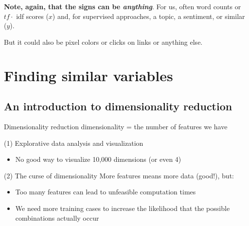 \documentclass[compress]{beamer}
\begin{document}
\begin{frame}[plain]
\textbf{Note, again, that the  signs can be \emph{anything}}.
For us, often word counts or $tf\cdot$ idf scores ($x$) and, for supervised approaches, a topic, a sentiment, or similar ($y$). 

But it could also be pixel colors or clicks on links or anything else.
\begin{table}[]
\end{table}
\end{frame}


\section{Finding similar variables}

\subsection{An introduction to dimensionality reduction}

\begin{frame}{Dimensionality reduction}
dimensionality = the number of features we have



\begin{block}{(1) Explorative data analysis and visualization}
\begin{itemize}
\item No good way to visualize 10,000 dimensions (or even 4)
\end{itemize}
\end{block}

\pause


\begin{block}{(2) The curse of dimensionality}
More features means more data (good!), but:
\begin{itemize}
\item Too many features can lead to unfeasible computation times
\item We need more training cases to increase the likelihood that the possible combinations actually occur
\end{itemize}
\end{block}
\end{frame}
\end{document}
